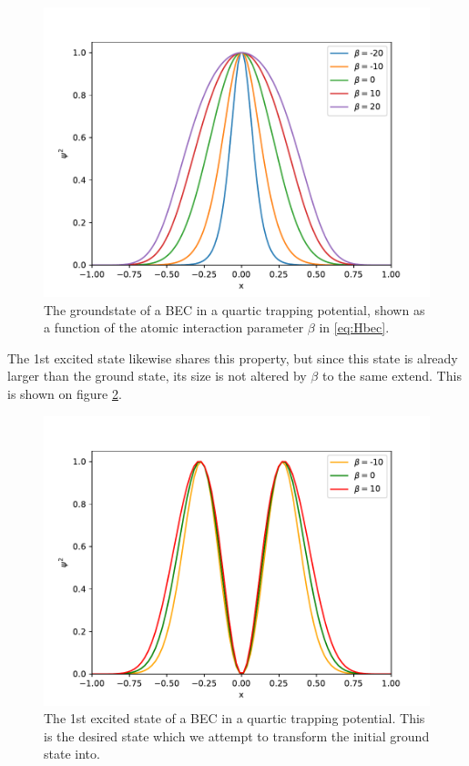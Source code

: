 \documentclass[aps,pra,reprint,superscriptaddress]{revtex4-1}
\begin{document}
\begin{figure}[h]
	\includegraphics[width=\columnwidth]{graphics/groundstate.pdf}
	\caption{The groundstate of a BEC in a quartic trapping potential, shown as a function of the atomic interaction parameter $\beta$ in \ref{eq:Hbec}.}
	\label{fig:BECgroundstate}
\end{figure}

The 1st excited state likewise shares this property, but since this state is already larger than the ground state, its size is not altered by $\beta$ to the same extend. This is shown on figure \ref{fig:BECexcitedstate}.

\begin{figure}
	\includegraphics[width=\columnwidth]{graphics/excitedstate.pdf}
	\caption{The 1st excited state of a BEC in a quartic trapping potential. This is the desired state which we attempt to transform the initial ground state into.}
	\label{fig:BECexcitedstate}
\end{figure}
\end{document}

